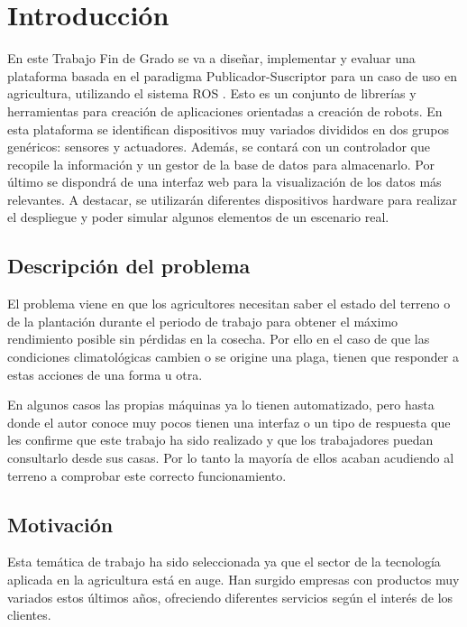\chapter{Introducción}

En este Trabajo Fin de Grado se va a diseñar, implementar y evaluar una plataforma basada en el paradigma Publicador-Suscriptor \cite{pub-sub-solutions} para un caso de uso en agricultura, utilizando el sistema \ac{ROS} \cite{ros2}. Esto es un conjunto de librerías y herramientas para creación de aplicaciones orientadas a creación de robots. En esta plataforma se identifican dispositivos muy variados divididos en dos grupos genéricos: sensores y actuadores. Además, se contará con un controlador que recopile la información y un gestor de la base de datos para almacenarlo. Por último se dispondrá de una interfaz web para la visualización de los datos más relevantes. A destacar, se utilizarán diferentes dispositivos hardware para realizar el despliegue y poder simular algunos elementos de un escenario real.

\section{Descripción del problema}

El problema viene en que los agricultores necesitan saber el estado del terreno o de la plantación durante el periodo de trabajo para obtener el máximo rendimiento posible sin pérdidas en la cosecha. Por ello en el caso de que las condiciones climatológicas cambien o se origine una plaga, tienen que responder a estas acciones de una forma u otra.

En algunos casos las propias máquinas ya lo tienen automatizado, pero hasta donde el autor conoce muy pocos tienen una interfaz o un tipo de respuesta que les confirme que este trabajo ha sido realizado y que los trabajadores puedan consultarlo desde sus casas. Por lo tanto la mayoría de ellos acaban acudiendo al terreno a comprobar este correcto funcionamiento.

\section{Motivación}

Esta temática de trabajo ha sido seleccionada ya que el sector de la tecnología aplicada en la agricultura está en auge. Han surgido empresas con productos muy variados estos últimos años, ofreciendo diferentes servicios según el interés de los clientes.

